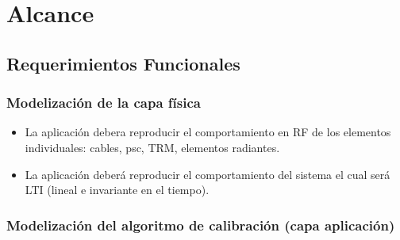 \documentclass[a4paper,10pt]{article}
\begin{document}
\section{Alcance}

\subsection{Requerimientos Funcionales}

\subsubsection{Modelización de la capa física}


\begin{itemize}
    \item La aplicación debera reproducir el comportamiento en RF de los 
elementos individuales: cables, psc, TRM, elementos radiantes.

    \item La aplicación deberá reproducir el comportamiento del sistema el cual 
será LTI (lineal e invariante en el tiempo).
\end{itemize}

\subsubsection{Modelización del algoritmo de calibración (capa aplicación)}
\end{document}
